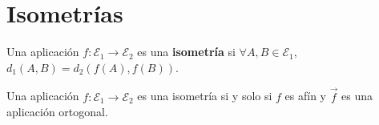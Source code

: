 \section{Isometrías}
\begin{fdefinition}[Isometría]
\normalfont Una aplicación $\displaystyle f : \mathcal{E}_{1} \to \mathcal{E}_{2} $ es una \textbf{isometría} si $\displaystyle \forall A,B \in \mathcal{E}_{1} $, $\displaystyle d _{1}\left(A,B\right) = d _{2}\left(f\left(A\right), f\left(B\right)\right) $. 
\end{fdefinition}
\begin{ftheorem}[]
\normalfont Una aplicación $\displaystyle f : \mathcal{E}_{1} \to \mathcal{E}_{2} $ es una isometría si y solo si $\displaystyle f $ es afín y $\displaystyle \vec{f} $ es una aplicación ortogonal. 
\end{ftheorem}
